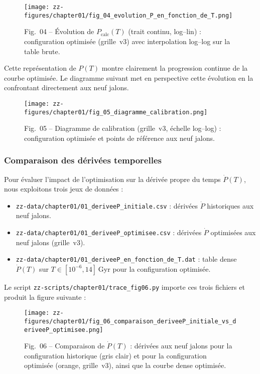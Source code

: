 \begin{figure}[htbp]
  \centering
  \texttt{[image: zz-figures/chapter01/fig\_04\_evolution\_P\_en\_fonction\_de\_T.png]}
  \caption{Fig.~04 – Évolution de \(P_{\mathrm{calc}}(T)\) (trait continu, log–lin) :  
           configuration optimisée (grille~v3) avec interpolation log–log sur la table brute.}
  \label{fig:p_vs_t_calibration}
\end{figure}

Cette représentation de \(P(T)\) montre clairement la progression continue de la courbe optimisée.  
Le diagramme suivant met en perspective cette évolution en la confrontant directement aux neuf jalons.

\begin{figure}[htbp]
  \centering
  \texttt{[image: zz-figures/chapter01/fig\_05\_diagramme\_calibration.png]}
  \caption{Fig.~05 – Diagramme de calibration (grille~v3, échelle log–log) :  
           configuration optimisée et points de référence aux neuf jalons.}
  \label{fig:diagramme_calibration}
\end{figure}

\subsubsection{Comparaison des dérivées temporelles}

Pour évaluer l’impact de l’optimisation sur la dérivée propre du temps \(\dot P(T)\),  
nous exploitons trois jeux de données :

\begin{itemize}
  \item \texttt{zz-data/chapter01/01\_deriveeP\_initiale.csv} :  
        dérivées \(\dot P\) historiques aux neuf jalons.
  \item \texttt{zz-data/chapter01/01\_deriveeP\_optimisee.csv} :  
        dérivées \(\dot P\) optimisées aux neuf jalons (grille~v3).
  \item \texttt{zz-data/chapter01/01\_deriveeP\_en\_fonction\_de\_T.dat} :  
        table dense \(\dot P(T)\) sur \(T\in[10^{-6},14]\) Gyr pour la configuration optimisée.
\end{itemize}

Le script \texttt{zz-scripts/chapter01/trace\_fig06.py} importe ces trois fichiers  
et produit la figure suivante :

\begin{figure}[htbp]
  \centering
  \texttt{[image: zz-figures/chapter01/fig\_06\_comparaison\_deriveeP\_initiale\_vs\_deriveeP\_optimisee.png]}
  \caption{Fig.~06 – Comparaison de \(\dot P(T)\) :  
           dérivées aux neuf jalons pour la configuration historique (gris clair)  
           et pour la configuration optimisée (orange, grille~v3), ainsi que la courbe dense optimisée.}
  \label{fig:comparaison_deriveeP}
\end{figure}

